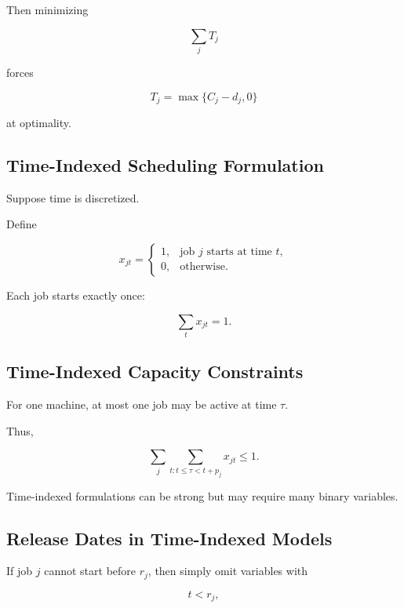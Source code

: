Then minimizing

\[
\boxed{
\sum_jT_j
}
\]

forces

\[
T_j
=
\max
\{
C_j-d_j,
0
\}
\]

at optimality.

\subsection{Time-Indexed Scheduling Formulation}
\label{subsec:time-indexed-scheduling}

Suppose time is discretized.

Define

\[
x_{jt}
=
\begin{cases}
1,
&
\text{job }j\text{ starts at time }t,
\\
0,
&
\text{otherwise}.
\end{cases}
\]

Each job starts exactly once:

\[
\boxed{
\sum_t
x_{jt}
=
1.
}
\]

\subsection{Time-Indexed Capacity Constraints}
\label{subsec:time-indexed-capacity}

For one machine, at most one job may be active at time \(\tau\).

Thus,

\[
\boxed{
\sum_j
\sum_{
t:
t\leq\tau<t+p_j
}
x_{jt}
\leq
1.
}
\]

Time-indexed formulations can be strong but may require many binary
variables.

\subsection{Release Dates in Time-Indexed Models}
\label{subsec:time-indexed-release-dates}

If job \(j\) cannot start before \(r_j\), then simply omit variables with

\[
t<r_j,
\]

